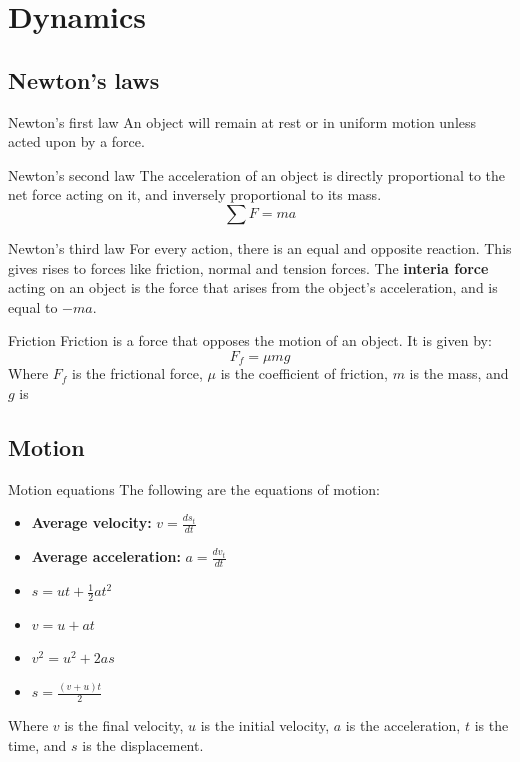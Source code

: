 \documentclass{article}
\begin{document}
\section{Dynamics}

\subsection{Newton's laws}
\begin{definition}
    {Newton's first law}
    An object will remain at rest or in uniform motion unless acted upon by a force.
\end{definition}

\begin{definition}
    {Newton's second law}
    The acceleration of an object is directly proportional to the net force acting on it, and inversely proportional to its mass.
    \[\sum F=ma\]
\end{definition}

\begin{definition}
    {Newton's third law}
    For every action, there is an equal and opposite reaction. This gives rises to forces like friction, normal and tension forces.
    \tcblower
    The \textbf{interia force} acting on an object is the force that arises from the object's acceleration, and is equal to $-ma$.
\end{definition}

\begin{knBox}
    {Friction}
    Friction is a force that opposes the motion of an object. It is given by:
    \[F_f=\mu mg\]
    Where $F_f$ is the frictional force, $\mu$ is the coefficient of friction, $m$ is the mass, and $g$ is
\end{knBox}

\subsection{Motion}
\begin{theorem}
    {Motion equations}
    The following are the equations of motion:
    \begin{itemize}
        \item \textbf{Average velocity: }$v=\frac{ds_t}{dt}$
        \item \textbf{Average acceleration: }$a=\frac{dv_t}{dt}$
        \item $s=ut+\frac{1}{2}at^2$
        \item $v=u+at$
        \item $v^2=u^2+2as$
        \item $s=\frac{(v+u)t}{2}$
    \end{itemize}
    Where $v$ is the final velocity, $u$ is the initial velocity, $a$ is the acceleration, $t$ is the time, and $s$ is the displacement.
\end{theorem}
\end{document}
